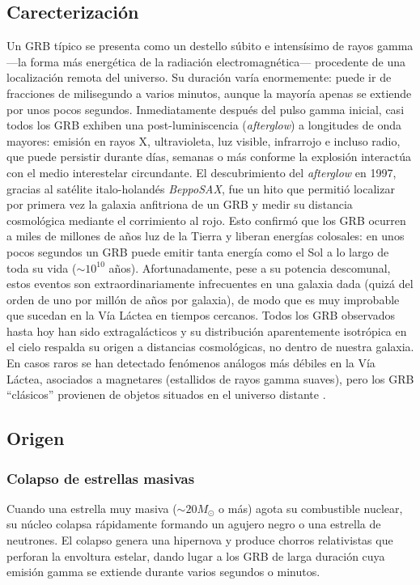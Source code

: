 \documentclass[final,5p,times,twocolumn,authoryear]{elsarticle}
\begin{document}
\subsection{Carecterización}

Un GRB típico se presenta como un destello súbito e intensísimo de rayos gamma ---la forma más energética de la radiación electromagnética--- procedente de una localización remota del universo. Su duración varía enormemente: puede ir de fracciones de milisegundo a varios minutos, aunque la mayoría apenas se extiende por unos pocos segundos. Inmediatamente después del pulso gamma inicial, casi todos los GRB exhiben una post-luminiscencia (\textit{afterglow}) a longitudes de onda mayores: emisión en rayos X, ultravioleta, luz visible, infrarrojo e incluso radio, que puede persistir durante días, semanas o más conforme la explosión interactúa con el medio interestelar circundante. El descubrimiento del \textit{afterglow} en 1997, gracias al satélite italo-holandés \textit{BeppoSAX}, fue un hito que permitió localizar por primera vez la galaxia anfitriona de un GRB y medir su distancia cosmológica mediante el corrimiento al rojo. Esto confirmó que los GRB ocurren a miles de millones de años luz de la Tierra y liberan energías colosales: en unos pocos segundos un GRB puede emitir tanta energía como el Sol a lo largo de toda su vida (\(\sim 10^{10}\) años). Afortunadamente, pese a su potencia descomunal, estos eventos son extraordinariamente infrecuentes en una galaxia dada (quizá del orden de uno por millón de años por galaxia), de modo que es muy improbable que sucedan en la Vía Láctea en tiempos cercanos. Todos los GRB observados hasta hoy han sido extragalácticos y su distribución aparentemente isotrópica en el cielo respalda su origen a distancias cosmológicas, no dentro de nuestra galaxia. En casos raros se han detectado fenómenos análogos más débiles en la Vía Láctea, asociados a magnetares (estallidos de rayos gamma suaves), pero los GRB ``clásicos'' provienen de objetos situados en el universo distante \citep{Xu2009GRB}.

\subsection{Origen}

\vspace{0.8\baselineskip} %

\subsubsection{Colapso de estrellas masivas}
Cuando una estrella muy masiva ($\sim 20 M_{\odot}$ o más) agota su combustible
nuclear, su núcleo colapsa rápidamente formando un agujero negro o una
estrella de neutrones. El colapso genera una hipernova y produce chorros
relativistas que perforan la envoltura estelar, dando lugar a los GRB de
larga duración cuya emisión gamma se extiende durante varios segundos o
minutos.
\end{document}

